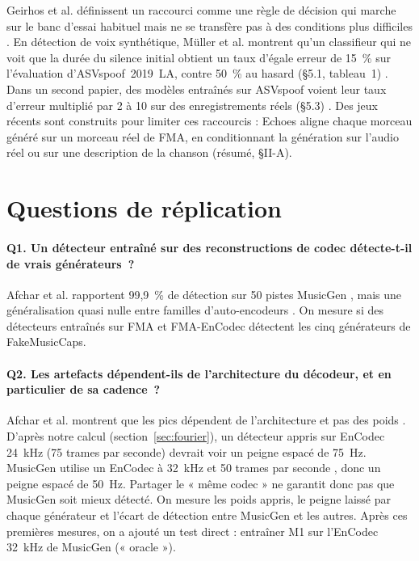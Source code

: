 \documentclass[a4paper, 11pt]{article}
\begin{document}
Geirhos et al. définissent un raccourci comme une règle de décision qui marche sur le banc d'essai habituel
mais ne se transfère pas à des conditions plus difficiles \cite{geirhos2020shortcut}. En détection de voix
synthétique, Müller et al. montrent qu'un classifieur qui ne voit que la durée du silence initial obtient un
taux d'égale erreur de 15~\% sur l'évaluation d'ASVspoof~2019~LA, contre 50~\% au hasard (§5.1, tableau~1)
\cite{muller2021silence}. Dans un second papier, des modèles entraînés sur ASVspoof voient leur taux d'erreur
multiplié par 2 à 10 sur des enregistrements réels (§5.3) \cite{muller2022generalize}. Des jeux récents
sont construits pour limiter ces raccourcis : Echoes \cite{pascu2026echoes} aligne chaque morceau généré sur un
morceau réel de FMA, en conditionnant la génération sur l'audio réel ou sur une description de la chanson
(résumé, §II-A).

\section{Questions de réplication}
\label{sec:questions}

\paragraph{Q1. Un détecteur entraîné sur des reconstructions de codec détecte-t-il de vrais générateurs~?}
Afchar et al. rapportent 99,9~\% de détection sur 50 pistes MusicGen \cite{afchar2025challenges}, mais une
généralisation quasi nulle entre familles d'auto-encodeurs \cite{afchar2024easy}. On mesure si des détecteurs
entraînés sur FMA et FMA-EnCodec détectent les cinq générateurs de FakeMusicCaps.

\paragraph{Q2. Les artefacts dépendent-ils de l'architecture du décodeur, et en particulier de sa cadence~?}
Afchar et al. montrent que les pics dépendent de l'architecture et pas des poids \cite{afchar2025fourier}.
D'après notre calcul (section~\ref{sec:fourier}), un détecteur appris sur EnCodec 24~kHz (75 trames par
seconde) devrait voir un peigne espacé de 75~Hz. MusicGen utilise un EnCodec à 32~kHz et 50 trames par seconde \cite{copet2023musicgen}, donc un peigne
espacé de 50~Hz. Partager le « même codec » ne garantit donc pas que MusicGen soit mieux détecté. On mesure les
poids appris, le peigne laissé par chaque générateur et l'écart de détection entre MusicGen et les autres. Après
ces premières mesures, on a ajouté un test direct : entraîner M1 sur l'EnCodec 32~kHz de MusicGen (« oracle »).
\end{document}
